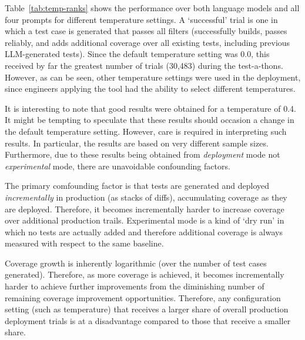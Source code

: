 \documentclass[sigconf,screen]{acmart}
\begin{document}
Table~\ref{tab:temp-ranks} shows the performance over both language models and all four prompts for different temperature settings.
A `successful' trial is one in which a test case is generated that passes all filters 
(successfully builds, passes reliably, and adds additional coverage over all existing tests, including previous LLM-generated tests).
Since the default temperature setting was 0.0, this received by far the greatest number of trials (30,483) during the test-a-thons.
However, as can be seen, other temperature settings were used in the deployment, since engineers applying the tool had the ability to select different temperatures.

It is interesting to note that good results were obtained for a  temperature of 0.4.
It might be tempting to speculate that these results should occasion a change in the default temperature setting.
However, care is required in interpreting such results. 
In particular, the results are based on very different sample sizes.
Furthermore, due to these results being obtained from {\em deployment} mode not {\em experimental} mode, there are unavoidable confounding factors.

The primary comfounding factor is that tests are generated and deployed 
{\em incrementally} in production (as stacks of diffs), 
accumulating coverage as they are deployed.  
Therefore, it becomes incrementally harder to increase coverage over additional production trails.
Experimental mode is a kind of `dry run' in which no tests are actually added and therefore additional coverage is always measured with respect to the same baseline.

Coverage  growth is inherently  logarithmic (over the number of test cases generated).
Therefore,  as more coverage is achieved, it becomes incrementally harder to achieve further improvements from the diminishing number of remaining coverage improvement opportunities.
Therefore, any  configuration setting (such as temperature) that receives a larger share of overall production deployment trials is at a disadvantage compared to those that receive a smaller share.
\end{document}
